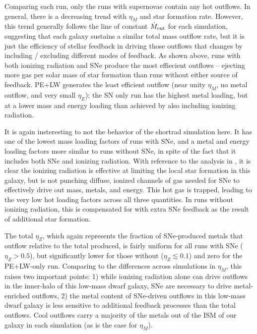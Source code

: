 \documentclass[twocolumn]{aastex62}
\newcommand{\aje}[1]{\textcolor{blue}{\textbf{(AJE: #1)}}}
\begin{document}
Comparing each run, only the runs with supernovae contain any hot outflows. In general, there is a decreasing trend with $\eta_M$ and star formation rate. However, this trend generally follows the line of constant $\dot{M}_{\rm out}$ for each simulation, suggesting that each galaxy sustains a similar total mass outflow rate, but it is just the efficiency of stellar feedback in driving those outflows that changes by including / excluding different modes of feedback. As shown above, runs with both ionizing radiation and SNe produce the most effiecient outflows -- ejecting more gas per solar mass of star formation than runs without either source of feedback. PE+LW generates the least efficient outflow (near unity $\eta_M$, no metal outflow, and very small $\eta_E$); the SN only run has the highest metal loading, but at a lower mass and energy loading than achieved by also including ionizing radiation. 

It is again insteresting to not the behavior of the shortrad simulation here. It has one of the lowest mass loading factors of runs with SNe, and a metal and energy loading factors more similar to runs without SNe, in spite of the fact that it includes both SNe and ionizing radiation. With reference to the analysis in \citet{Emerick2018a}, it is clear the ionizing radiation is effective at limiting the local star formation in this galaxy, but is not punching diffuse, ionized channels of gas needed for SNe to effectively drive out mass, metals, and energy. This hot gas is trapped, leading to the very low hot loading factors across all three quantities. In runs without ionizing radiation, this is compensated for with extra SNe feedback as the result of additional star formation.




The total $\eta_Z$, which again represents the fraction of SNe-produced metals that outflow relative to the total produced, is fairly uniform for all runs with SNe ($\eta_Z > 0.5$), but significantly lower for those without ($\eta_Z \lesssim 0.1$) and zero for the PE+LW-only run. Comparing to the differences across simulations in $\eta_M$, this raises two important points: 1) while ionizing radiation alone can drive outflows in the inner-halo of this low-mass dwarf galaxy, SNe are necessary to drive metal-enriched outflows, 2) the metal content of SNe-driven outflows in this low-mass dwarf galaxy is less sensitive to additional feedback processes than the total outflows. Cool outflows carry a majority of the metals out of the ISM of our galaxy in each simulation (as is the case for $\eta_M$).
\end{document}
